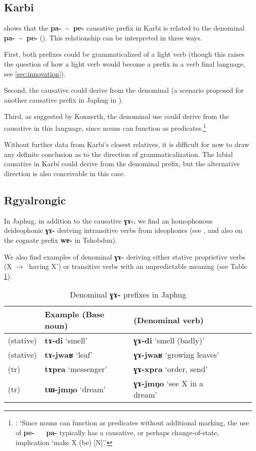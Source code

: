 \documentclass[oneside,a4paper,11pt]{article}
\newcommand{\ipa}[1]{\textbf{{\phon\mbox{#1}}}} %
\newcommand{\forme}[2]{\ipa{#1} `#2'}
\newcommand{\tld}{\textasciitilde{}}
\begin{document}
\subsection{Karbi} \label{sec:karbi.denom}
\citet[238]{konnerth14karbi} shows that the  \ipa{pa- \tld{} pe-} causative prefix in Karbi is related to the denominal  \ipa{pa- \tld{} pe-} (\citealt[205]{konnerth14karbi}). This relationship can be interpreted in three ways. 

First, both prefixes could be grammaticalized of a light verb (though this raises the question of how a light verb would become a prefix in a verb final language, see \ref{sec:innovation}). 

Second, the causative could derive from the denominal (a scenario proposed for another causative prefix in Japhug in \citealt{jacques15causative}). 

Third, as suggested by Konnerth, the denominal use could derive from the causative in this language, since nouns can function as predicates.\footnote{\citet[205]{konnerth14karbi}: `Since nouns can function as predicates without additional marking, the use of \ipa{pe- ~ pa-} typically has a causative, or perhaps change-of-state, implication `make X (be) [N]'.'}

Without further data from Karbi's closest relatives, it is difficult for now to draw any definite conclusion as to the direction of grammaticalization. The labial causative in Karbi could derive from the denominal prefix, but the alternative direction is also conceivable in this case.

\subsection{Rgyalrongic} \label{sec:rgyalrong.denom}
In Japhug, in addition to the causative \ipa{ɣɤ-}, we find an homophonous deideophonic \ipa{ɣɤ-} deriving intransitive verbs from ideophones (see \citealt{japhug14ideophones}, and also \citealt{jackson04zhuangmaoci, jackson14morpho} on the cognate prefix \ipa{wɐ-} in Tshobdun).

We also find examples of denominal \ipa{ɣɤ-} deriving either stative proprietive verbs (X $\rightarrow$ `having X') or transitive verbs with an unpredictable meaning (see Table \ref{tab:denominal.GA}).

\begin{table}[H]
\caption{Denominal \ipa{ɣɤ-} prefixes in Japhug} \label{tab:denominal.GA} \centering
\begin{tabular}{llllll}
\toprule
 & Example (Base noun) & (Denominal verb)\\
\midrule
(stative)& \forme{tɤ-di}{smell} & \forme{ɣɤ-di}{smell (badly)} \\
(stative) & \forme{tɤ-jwaʁ}{leaf} & \forme{ɣɤ-jwaʁ}{growing leaves} \\
\midrule
(tr) & \forme{tɤpra}{messenger} & \forme{ɣɤ-xpra}{order, send} \\
(tr) & \forme{tɯ-jmŋo}{dream} & \forme{ɣɤ-jmŋo}{see X in a dream} \\
\bottomrule
\end{tabular}
\end{table}
\end{document}
